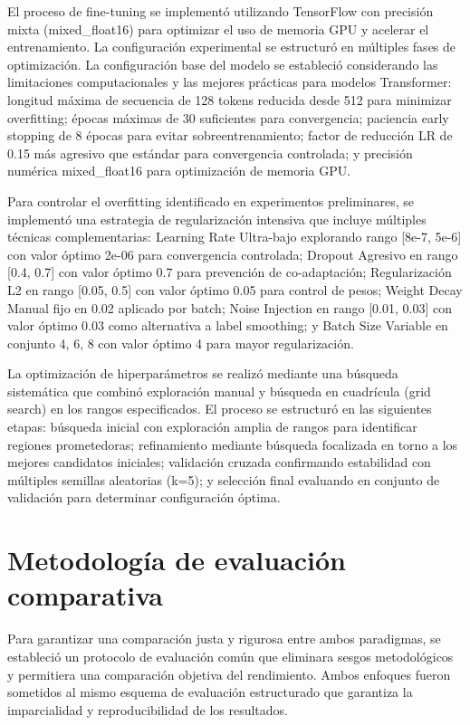 El proceso de fine-tuning se implementó utilizando TensorFlow con precisión mixta (mixed\_float16) para optimizar el uso de memoria GPU y acelerar el entrenamiento. La configuración experimental se estructuró en múltiples fases de optimización. La configuración base del modelo se estableció considerando las limitaciones computacionales y las mejores prácticas para modelos Transformer: longitud máxima de secuencia de 128 tokens reducida desde 512 para minimizar overfitting; épocas máximas de 30 suficientes para convergencia; paciencia early stopping de 8 épocas para evitar sobreentrenamiento; factor de reducción LR de 0.15 más agresivo que estándar para convergencia controlada; y precisión numérica mixed\_float16 para optimización de memoria GPU.

Para controlar el overfitting identificado en experimentos preliminares, se implementó una estrategia de regularización intensiva que incluye múltiples técnicas complementarias: Learning Rate Ultra-bajo explorando rango [8e-7, 5e-6] con valor óptimo 2e-06 para convergencia controlada; Dropout Agresivo en rango [0.4, 0.7] con valor óptimo 0.7 para prevención de co-adaptación; Regularización L2 en rango [0.05, 0.5] con valor óptimo 0.05 para control de pesos; Weight Decay Manual fijo en 0.02 aplicado por batch; Noise Injection en rango [0.01, 0.03] con valor óptimo 0.03 como alternativa a label smoothing; y Batch Size Variable en conjunto {4, 6, 8} con valor óptimo 4 para mayor regularización.

La optimización de hiperparámetros se realizó mediante una búsqueda sistemática que combinó exploración manual y búsqueda en cuadrícula (grid search) en los rangos especificados. El proceso se estructuró en las siguientes etapas: búsqueda inicial con exploración amplia de rangos para identificar regiones prometedoras; refinamiento mediante búsqueda focalizada en torno a los mejores candidatos iniciales; validación cruzada confirmando estabilidad con múltiples semillas aleatorias (k=5); y selección final evaluando en conjunto de validación para determinar configuración óptima.

\section{Metodología de evaluación comparativa}
\label{sec:evaluacion_comparativa}

Para garantizar una comparación justa y rigurosa entre ambos paradigmas, se estableció un protocolo de evaluación común que eliminara sesgos metodológicos y permitiera una comparación objetiva del rendimiento. Ambos enfoques fueron sometidos al mismo esquema de evaluación estructurado que garantiza la imparcialidad y reproducibilidad de los resultados.

